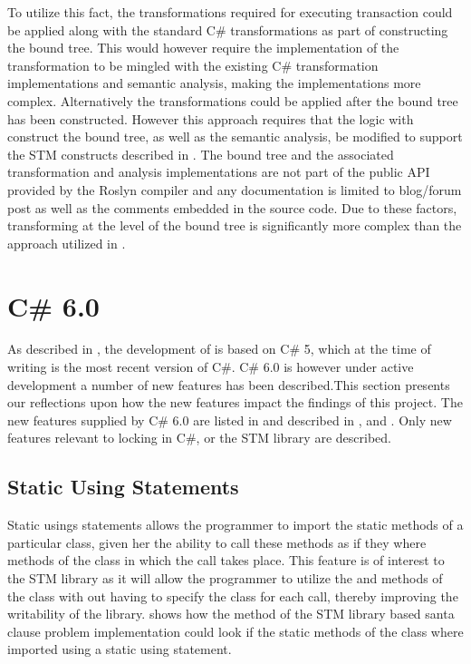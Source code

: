 To utilize this fact, the transformations required for executing transaction could be applied along with the standard C\# transformations as part of constructing the bound tree. This would however require the implementation of the transformation to be mingled with the existing C\# transformation implementations and semantic analysis, making the implementations more complex. Alternatively the transformations could be applied after the bound tree has been constructed. However this approach requires that the logic with construct the bound tree, as well as the semantic analysis, be modified to support the \ac{STM} constructs described in . The bound tree and the associated transformation and analysis implementations are not part of the public \ac{API} provided by the Roslyn compiler and any documentation is limited to blog/forum post as well as the comments embedded in the source code. Due to these factors, transforming at the level of the bound tree is significantly more complex than the approach utilized in .

\section{C\# 6.0}
As described in , the development of \stmname is based on C\# 5, which at the time of writing is the most recent version of C\#. C\# 6.0 is however under active development a number of new features has been described.This section presents our reflections upon how the new features impact the findings of this project. The new features supplied by C\# 6.0 are listed in \cite{csharp6Features} and described in \cite{csharp6one}, \cite{csharp6two} and \cite{csharp6featureDescription}. Only new features relevant to locking in C\#, \stmname or the \ac{STM} library are described. 

\subsection{Static Using Statements}
Static usings statements allows the programmer to import the static methods of a particular class, given her the ability to call these methods as if they where methods of the class in which the call takes place\cite{csharp6one}\cite{csharp6featureDescription}. This feature is of interest to the \ac{STM} library as it will allow the programmer to utilize the  and  methods of the  class with out having to specify the class for each call, thereby improving the writability of the library.  shows how the  method of the \ac{STM} library based santa clause problem implementation could look if the static methods of the  class where imported using a static using statement.


